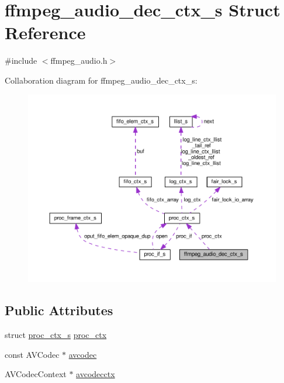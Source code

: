 \hypertarget{structffmpeg__audio__dec__ctx__s}{}\section{ffmpeg\+\_\+audio\+\_\+dec\+\_\+ctx\+\_\+s Struct Reference}
\label{structffmpeg__audio__dec__ctx__s}


{\ttfamily \#include $<$ffmpeg\+\_\+audio.\+h$>$}



Collaboration diagram for ffmpeg\+\_\+audio\+\_\+dec\+\_\+ctx\+\_\+s\+:\nopagebreak
\begin{figure}[H]
\begin{center}
\leavevmode
\includegraphics[width=350pt]{structffmpeg__audio__dec__ctx__s__coll__graph}
\end{center}
\end{figure}
\subsection*{Public Attributes}
\begin{DoxyCompactItemize}
\item 
struct \hyperlink{structproc__ctx__s}{proc\+\_\+ctx\+\_\+s} \hyperlink{structffmpeg__audio__dec__ctx__s_a7d595b487c31ee5bd9b809bfb0403c5e}{proc\+\_\+ctx}
\item 
const A\+V\+Codec $\ast$ \hyperlink{structffmpeg__audio__dec__ctx__s_a8a73d6d4be6d11d6b1748cd5de5809b1}{avcodec}
\item 
A\+V\+Codec\+Context $\ast$ \hyperlink{structffmpeg__audio__dec__ctx__s_a0eacb15c64cb86d241a420b859d12e78}{avcodecctx}
\end{DoxyCompactItemize}


